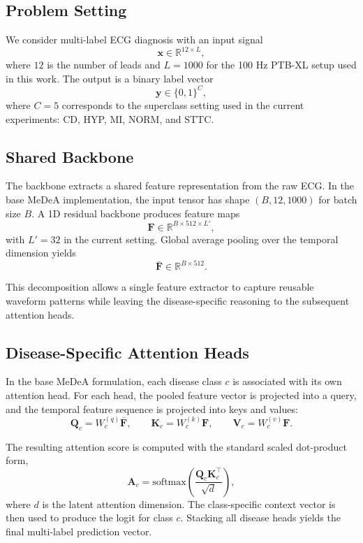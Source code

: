 \documentclass[11pt]{article}
\begin{document}
\subsection{Problem Setting}

We consider multi-label ECG diagnosis with an input signal
\[
\mathbf{x} \in \mathbb{R}^{12 \times L},
\]
where $12$ is the number of leads and $L=1000$ for the 100 Hz PTB-XL setup used in this work. The output is a binary label vector
\[
\mathbf{y} \in \{0,1\}^{C},
\]
where $C=5$ corresponds to the superclass setting used in the current experiments: CD, HYP, MI, NORM, and STTC.

\subsection{Shared Backbone}

The backbone extracts a shared feature representation from the raw ECG. In the base MeDeA implementation, the input tensor has shape $(B,12,1000)$ for batch size $B$. A 1D residual backbone produces feature maps
\[
\mathbf{F} \in \mathbb{R}^{B \times 512 \times L'},
\]
with $L'=32$ in the current setting. Global average pooling over the temporal dimension yields
\[
\bar{\mathbf{F}} \in \mathbb{R}^{B \times 512}.
\]

This decomposition allows a single feature extractor to capture reusable waveform patterns while leaving the disease-specific reasoning to the subsequent attention heads.

\subsection{Disease-Specific Attention Heads}

In the base MeDeA formulation, each disease class $c$ is associated with its own attention head. For each head, the pooled feature vector is projected into a query, and the temporal feature sequence is projected into keys and values:
\[
\mathbf{Q}_c = W_c^{(q)} \bar{\mathbf{F}}, \qquad
\mathbf{K}_c = W_c^{(k)} \mathbf{F}, \qquad
\mathbf{V}_c = W_c^{(v)} \mathbf{F}.
\]

The resulting attention score is computed with the standard scaled dot-product form,
\[
\mathbf{A}_c = \mathrm{softmax}\left(\frac{\mathbf{Q}_c \mathbf{K}_c^\top}{\sqrt{d}}\right),
\]
where $d$ is the latent attention dimension. The class-specific context vector is then used to produce the logit for class $c$. Stacking all disease heads yields the final multi-label prediction vector.
\end{document}
